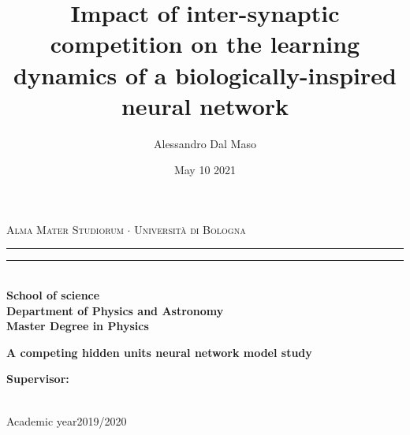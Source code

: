 \documentclass[a4paper]{report}
\title{Impact of inter-synaptic competition on the learning dynamics of a biologically-inspired neural network}
\author{Alessandro Dal Maso}
\date{May 10 2021}
\begin{document}
\begin{titlepage}
\begin{center}
{{\Large{\textsc{Alma Mater Studiorum $\cdot$ Universit\`a di Bologna}}}}
\rule[0.1cm]{15.8cm}{0.1mm}
\rule[0.5cm]{15.8cm}{0.6mm}
\\\vspace{3mm}
{\small{\bf School of science \\
Department of Physics and Astronomy\\
Master Degree in Physics}}
\end{center}
\vspace{23mm}
\begin{center}{
{\LARGE{\bf A competing hidden units neural network model study}}\\
}\end{center}
\vspace{50mm} \par \noindent
\begin{minipage}[t]{0.47\textwidth}
{\large{\bf Supervisor: \vspace{2mm}{
\newline Prof. Enrico Giampieri}\\\\}}
\end{minipage}
%
\hfill
%
\begin{minipage}[t]{0.47\textwidth}
\end{minipage}
\vspace{40mm}
\begin{center}
Academic year{2019/2020}
\end{center}
\end{titlepage}
\end{document}
